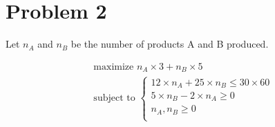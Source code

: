 \documentclass[a4paper, 10pt, twoside]{article}
\begin{document}
\section*{Problem 2}
Let $n_A$ and $n_B$ be the number of products A and B produced.

\begin{align*}
    &\text{maximize } n_A \times 3 + n_B \times 5 \\
    &\text{subject to } 
    \begin{cases}
        12 \times n_A + 25 \times n_B \le 30 \times 60 \\
        5 \times n_B - 2 \times n_A \ge 0 \\
        n_A, n_B \ge 0 \\
    \end{cases} 
\end{align*}
\end{document}
